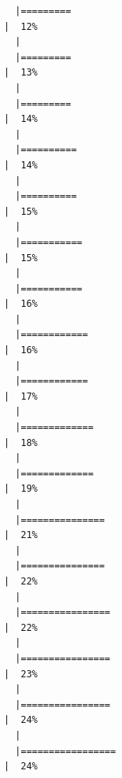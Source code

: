 \documentclass[
  letterpaper,
  DIV=11,
  numbers=noendperiod]{scrreprt}
\begin{document}
\begin{verbatim}
  |=========                                                             |  12%
  |                                                                            
  |=========                                                             |  13%
  |                                                                            
  |=========                                                             |  14%
  |                                                                            
  |==========                                                            |  14%
  |                                                                            
  |==========                                                            |  15%
  |                                                                            
  |===========                                                           |  15%
  |                                                                            
  |===========                                                           |  16%
  |                                                                            
  |============                                                          |  16%
  |                                                                            
  |============                                                          |  17%
  |                                                                            
  |=============                                                         |  18%
  |                                                                            
  |=============                                                         |  19%
  |                                                                            
  |===============                                                       |  21%
  |                                                                            
  |===============                                                       |  22%
  |                                                                            
  |================                                                      |  22%
  |                                                                            
  |================                                                      |  23%
  |                                                                            
  |================                                                      |  24%
  |                                                                            
  |=================                                                     |  24%

\end{verbatim}
\end{document}
